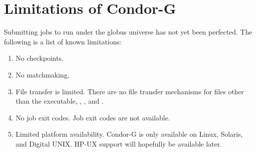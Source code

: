 \section{\label{sec:Condor-G-Limits}Limitations of Condor-G}

Submitting jobs to run under the globus universe has not yet
been perfected.
The following is a list of known limitations:

\begin{enumerate}
\item{No checkpoints.}
\item{No matchmaking.}
\item{File transfer is limited.}
There are no file transfer mechanisms for files other
than the executable, , , and .
\item{No job exit codes.}
Job exit codes are not available.
\item{Limited platform availability.}
Condor-G is only available on Linux, Solaris,
and Digital UNIX.
HP-UX support will hopefully be available later.
\end{enumerate}
